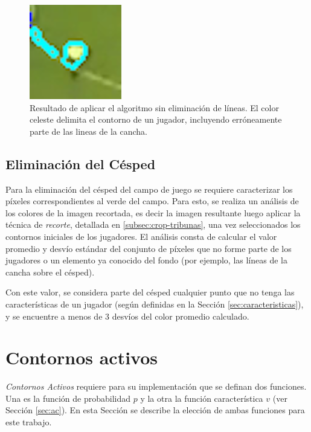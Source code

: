 \begin{figure}[H]
  \centering
  \includegraphics[width=0.3\linewidth]{./images/confusion-linea.png}
  \caption{ Resultado de aplicar el algoritmo sin eliminación de líneas.
    El color celeste delimita el contorno de un jugador, incluyendo erróneamente
    parte de las lineas de la cancha.}
      \label{fig:confusion-linea}
\end{figure}

\subsection{Eliminación del Césped}
\label{sec:cesped}

Para la eliminación del césped del campo de juego se requiere caracterizar los
píxeles correspondientes al verde del campo. Para esto, se realiza un análisis
de los colores de la imagen recortada, es decir la imagen resultante luego
aplicar la técnica de \textit{recorte}, detallada en
\ref{subsec:crop-tribunas}, una vez seleccionados los contornos iniciales de
los jugadores. El análisis consta de calcular el valor promedio y desvío
estándar del conjunto de píxeles que no forme parte de los jugadores o un
elemento ya conocido del fondo (por ejemplo, las líneas de la cancha sobre el
césped).

Con este valor, se considera parte del césped cualquier punto que no tenga las
características de un jugador (según definidas en la Sección
\ref{sec:caracteristicas}), y se encuentre a menos de $3$ desvíos del color
promedio calculado.

\section{Contornos activos} \label{sec:ac-extension}

\textit{Contornos Activos} requiere para su implementación que se definan dos
funciones. Una es la función de probabilidad $p$ y la otra la función
característica $v$ (ver Sección \ref{sec:ac}). En esta Sección se describe la
elección de ambas funciones para este trabajo.

